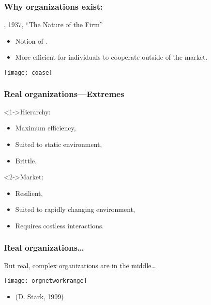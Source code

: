 \begin{frame}
  \frametitle{Why organizations exist:}

  \begin{block}{, 1937, ``The Nature of the Firm''\cite{coase1937a}}
    \begin{itemize}
    \item<1-> 
      Notion of .
    \item<1-> 
      More efficient for individuals to cooperate outside of the market.
    \end{itemize}
  \end{block}

  \begin{center}
    \texttt{[image: coase]}
  \end{center}

\end{frame}

\begin{frame}
  \frametitle{Real organizations---Extremes}

  \begin{block}<1->{Hierarchy:}
    \begin{itemize}
    \item 
      Maximum efficiency,
    \item 
      Suited to static environment,
    \item 
      Brittle.
    \end{itemize}
  \end{block}

  \begin{block}<2->{Market:}
    \begin{itemize}
    \item
      Resilient,
    \item
      Suited to rapidly changing environment,
    \item
      Requires costless interactions.
    \end{itemize}
  \end{block}

\end{frame}

\begin{frame}
  \frametitle{Real organizations\ldots}

  \begin{block}{But real, complex organizations are in the middle\ldots}
    \begin{center}
      \texttt{[image: orgnetworkrange]}
    \end{center}
    \begin{itemize}
    \item
       (D. Stark, 1999)\cite{stark1999a}
    \end{itemize}
  \end{block}

\end{frame}


